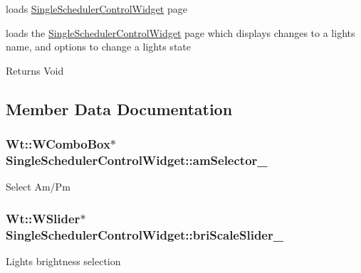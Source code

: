 loads \hyperlink{classSingleSchedulerControlWidget}{Single\+Scheduler\+Control\+Widget} page 

loads the \hyperlink{classSingleSchedulerControlWidget}{Single\+Scheduler\+Control\+Widget} page which displays changes to a light\textquotesingle{}s name, and options to change a light\textquotesingle{}s state

\begin{DoxyReturn}{Returns}
Void 
\end{DoxyReturn}


\subsection{Member Data Documentation}
\subsubsection[{\texorpdfstring{am\+Selector\+\_\+}{amSelector_}}]{\setlength{\rightskip}{0pt plus 5cm}Wt\+::\+W\+Combo\+Box$\ast$ Single\+Scheduler\+Control\+Widget\+::am\+Selector\+\_\+\hspace{0.3cm}{\ttfamily [private]}}\hypertarget{classSingleSchedulerControlWidget_a29f94e86583ee3ec6b509a7336772e3e}{}\label{classSingleSchedulerControlWidget_a29f94e86583ee3ec6b509a7336772e3e}
Select Am/\+Pm 
\subsubsection[{\texorpdfstring{bri\+Scale\+Slider\+\_\+}{briScaleSlider_}}]{\setlength{\rightskip}{0pt plus 5cm}Wt\+::\+W\+Slider$\ast$ Single\+Scheduler\+Control\+Widget\+::bri\+Scale\+Slider\+\_\+\hspace{0.3cm}{\ttfamily [private]}}\hypertarget{classSingleSchedulerControlWidget_a06c98bc002e49f45efd7180004884d8a}{}\label{classSingleSchedulerControlWidget_a06c98bc002e49f45efd7180004884d8a}
Light\textquotesingle{}s brightness selection 
